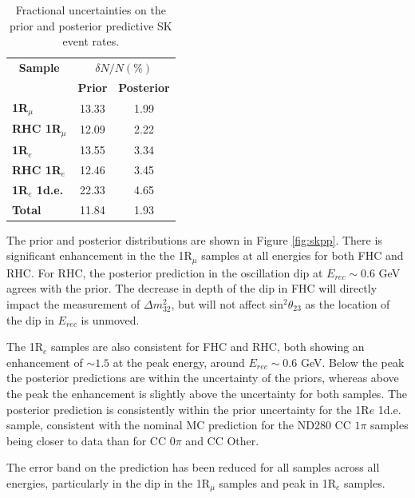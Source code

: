 \begin{center}
\begin{table}
\center
\begin{tabular}{l||c c}
\hline \hline
\multicolumn{1}{c||}{\textbf{Sample}} & \multicolumn{2}{c}{$\delta N/N (\%)$}\\
& \multicolumn{1}{c}{\textbf{Prior}} & \multicolumn{1}{c}{\textbf{Posterior}} \\
\hline\hline
\textbf{1R$_{\mu}$} & 13.33 & 1.99\\
\textbf{RHC 1R$_{\mu}$} & 12.09 & 2.22 \\ 
\textbf{1R$_{e}$} & 13.55 & 3.34\\
\textbf{RHC 1R$_{e}$} & 12.46 & 3.45\\
\textbf{1R$_{e}$ 1d.e.} & 22.33 & 4.65\\ \hline
\textbf{Total} & 11.84 & 1.93\\ \hline\hline
\end{tabular}
\caption{Fractional uncertainties on the prior and posterior predictive SK event rates.}
\label{tab:SKerr}
\end{table}
\end{center}

The prior and posterior distributions are shown in Figure \ref{fig:skpp}. There is significant enhancement in the the 1R$_{\mu}$ samples at all energies for both FHC and RHC. For RHC, the posterior prediction in the oscillation dip at $E_{rec}\sim0.6$ GeV agrees with the prior. The decrease in depth of the dip in FHC will directly impact the measurement of $\Delta m_{32}^2$, but will not affect sin$^{2}\theta_{23}$ as the location of the dip in $E_{rec}$ is unmoved. 

The 1R$_{e}$ samples are also consistent for FHC and RHC, both showing an enhancement of $\sim1.5$ at the peak energy, around $E_{rec}\sim0.6$ GeV. Below the peak the posterior predictions are within the uncertainty of the priors, whereas above the peak the enhancement is slightly above the uncertainty for both samples. The posterior prediction is consistently within the prior uncertainty for the 1R$e$ 1d.e. sample, consistent with the nominal MC prediction for the ND280 CC $1\pi$ samples being closer to data than for CC $0\pi$ and CC Other.

The error band on the prediction has been reduced for all samples across all energies, particularly in the dip in the 1R$_{\mu}$ samples and peak in 1R$_{e}$ samples.


